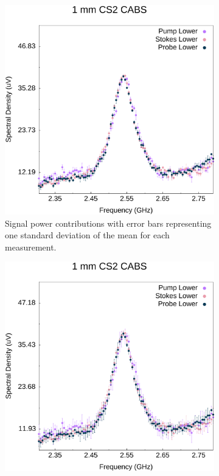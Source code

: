 \begin{figure}[h]
  \centering
  \begin{subfigure}{0.45\textwidth}
    \centering
    \includegraphics[width=\textwidth]{figs/4-CABS/PSPr-Contribute-Equally.pdf}
    \caption{Signal power contributions with error bars representing one standard deviation of the mean for each measurement.}
    \label{fig:PSPr-Contribute-Equally}
  \end{subfigure}%
  \hfill
  \begin{subfigure}{0.45\textwidth}
    \centering
    \includegraphics[width=\textwidth]{figs/4-CABS/PSPr-Contribute-Equally-2sigma.pdf}

\end{subfigure}
\end{figure}
